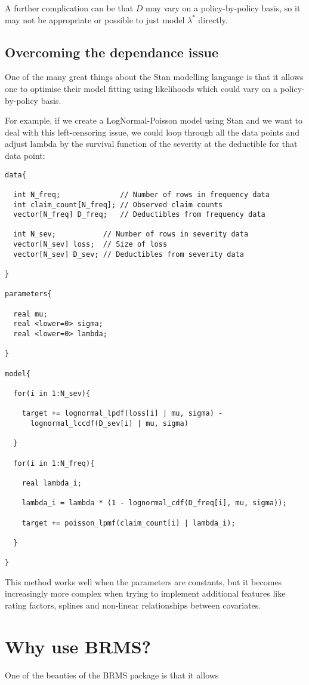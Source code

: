 \documentclass[
]{book}
\begin{document}
A further complication can be that \(D\) may vary on a policy-by-policy basis, so it may not be appropriate or possible to just model \(\lambda^*\) directly.

\hypertarget{overcoming-the-dependance-issue}{%
\subsection{Overcoming the dependance issue}\label{overcoming-the-dependance-issue}}

One of the many great things about the Stan modelling language is that it allows one to optimise their model fitting using likelihoods which could vary on a policy-by-policy basis.

For example, if we create a LogNormal-Poisson model using Stan and we want to deal with this left-censoring issue, we could loop through all the data points and adjust lambda by the survival function of the severity at the deductible for that data point:

\begin{verbatim}
data{

  int N_freq;              // Number of rows in frequency data
  int claim_count[N_freq]; // Observed claim counts
  vector[N_freq] D_freq;   // Deductibles from frequency data
  
  int N_sev;           // Number of rows in severity data
  vector[N_sev] loss;  // Size of loss 
  vector[N_sev] D_sev; // Deductibles from severity data

}

parameters{

  real mu;
  real <lower=0> sigma;
  real <lower=0> lambda;

}

model{

  for(i in 1:N_sev){
  
    target += lognormal_lpdf(loss[i] | mu, sigma) -
      lognormal_lccdf(D_sev[i] | mu, sigma)
  
  }

  for(i in 1:N_freq){

    real lambda_i;

    lambda_i = lambda * (1 - lognormal_cdf(D_freq[i], mu, sigma));
  
    target += poisson_lpmf(claim_count[i] | lambda_i);

  }

}
\end{verbatim}

This method works well when the parameters are constants, but it becomes increasingly more complex when trying to implement additional features like rating factors, splines and non-linear relationships between covariates.

\hypertarget{why-use-brms}{%
\section{Why use BRMS?}\label{why-use-brms}}

One of the beauties of the BRMS package is that it allows

  
\end{document}
